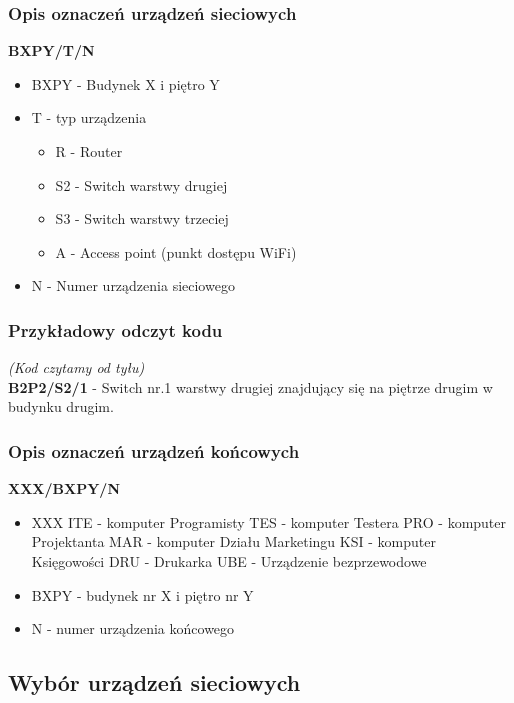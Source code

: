 \documentclass[a4paper,12pt]{extarticle}  %
\begin{document}
\subsubsection{Opis oznaczeń urządzeń sieciowych}
\textbf{BXPY/T/N}
\begin{itemize}
	\item BXPY - Budynek X i piętro Y
	\item T - typ urządzenia
	      \begin{itemize}
		      \item R - Router
		      \item S2 - Switch warstwy drugiej
		      \item S3 - Switch warstwy trzeciej
		      \item A - Access point (punkt dostępu WiFi)
	      \end{itemize}
	\item N - Numer urządzenia sieciowego
\end{itemize}
\subsubsection{Przykładowy odczyt kodu}
\emph{(Kod czytamy od tyłu)}\\
\textbf{B2P2/S2/1} - Switch nr.1 warstwy drugiej znajdujący się na piętrze drugim w budynku drugim.
\subsubsection{Opis oznaczeń urządzeń końcowych}
\textbf{XXX/BXPY/N}
\begin{itemize}
	\item XXX
	      \subitem ITE - komputer Programisty
	      \subitem TES - komputer Testera
	      \subitem PRO - komputer Projektanta
	      \subitem MAR - komputer Działu Marketingu
	      \subitem KSI - komputer Księgowości
	      \subitem DRU - Drukarka
	      \subitem UBE - Urządzenie bezprzewodowe
	\item BXPY - budynek nr X i piętro nr Y
	\item N - numer urządzenia końcowego
\end{itemize}

\subsection{Wybór urządzeń sieciowych}
\end{document}
